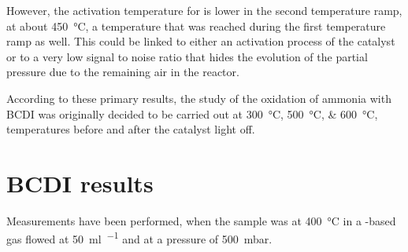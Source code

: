 However, the activation temperature for \nitrousoxide is lower in the second temperature ramp, at about \qty{450}{\degreeCelsius}, a temperature that was reached during the first temperature ramp as well.
This could be linked to either an activation process of the catalyst or to a very low signal to noise ratio that hides the evolution of the partial pressure due to the remaining air in the reactor.

According to these primary results, the study of the oxidation of ammonia with BCDI was originally decided to be carried out at \qtylist{300;500;600}{\degreeCelsius}, temperatures before and after the catalyst light off.

\begin{table}[!htb]
    \centering
    \caption{}
    \label{tab:my-table}
\end{table}


\section{BCDI results}

Measurements have been performed, when the sample was at \qty{400}{\degreeCelsius} in a \argon-based gas flowed at \qty{50}{\ml\per\min} and at a pressure of \qty{500}{\milli\bar}.

